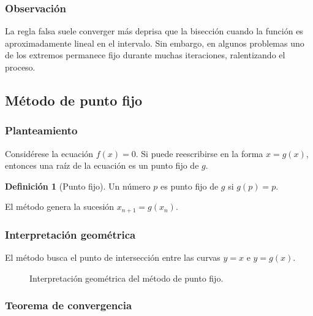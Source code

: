 \documentclass[a4paper,12pt]{article}
\theoremstyle{definition}
\newtheorem{definicion}{Definición}[section]
\theoremstyle{plain}
\begin{document}
\subsubsection{Observación}

La regla falsa suele converger más deprisa que la bisección cuando la función
es aproximadamente lineal en el intervalo. Sin embargo, en algunos problemas uno
de los extremos permanece fijo durante muchas iteraciones, ralentizando el
proceso.

\subsection{Método de punto fijo}

\subsubsection{Planteamiento}

Considérese la ecuación $f(x)=0$. Si puede reescribirse en la forma $x=g(x)$,
entonces una raíz de la ecuación es un punto fijo de $g$.

\begin{definicion}[Punto fijo]
Un número $p$ es punto fijo de $g$ si $g(p)=p$.
\end{definicion}

El método genera la sucesión $x_{n+1}=g(x_n)$.

\subsubsection{Interpretación geométrica}

El método busca el punto de intersección entre las curvas $y=x$ e $y=g(x)$.

\begin{figure}[H]
\centering
{}
\caption{Interpretación geométrica del método de punto fijo.}
\end{figure}

\subsubsection{Teorema de convergencia}
\end{document}

